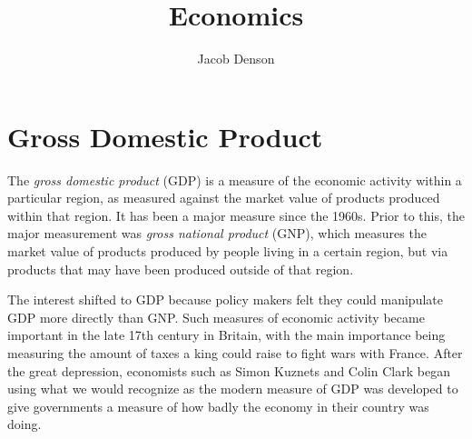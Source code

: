 

\title{Economics}
\author{Jacob Denson}



\maketitle
\tableofcontents
{}



\chapter{Gross Domestic Product}

The \emph{gross domestic product} (GDP) is a measure of the economic activity within a particular region, as measured against the market value of products produced within that region. It has been a major measure since the 1960s. Prior to this, the major measurement was \emph{gross national product} (GNP), which measures the market value of products produced by people living in a certain region, but via products that may have been produced outside of that region.

The interest shifted to GDP because policy makers felt they could manipulate GDP more directly than GNP. Such measures of economic activity became important in the late 17th century in Britain, with the main importance being measuring the amount of taxes a king could raise to fight wars with France. After the great depression, economists such as Simon Kuznets and Colin Clark began using what we would recognize as the modern measure of GDP was developed to give governments a measure of how badly the economy in their country was doing.

